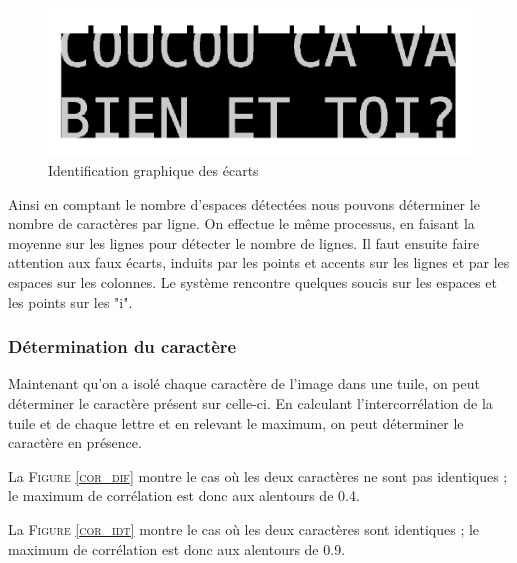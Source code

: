 \documentclass[a4paper,12pt,titlepage]{report}
\begin{document}
	\begin{figure}[h]
		\begin{center}
			\includegraphics[scale=0.4]{../illus/detectionSpace.png}
		\end{center}
		\vspace{-1em}
		\caption{Identification graphique des écarts}
	\end{figure}

	Ainsi en comptant le nombre d'espaces détectées nous pouvons déterminer le nombre de caractères par ligne.
	On effectue le même processus, en faisant la moyenne sur les lignes pour détecter le nombre de lignes.
	Il faut ensuite faire attention aux faux écarts, induits par les points et accents sur les lignes et par les espaces sur les colonnes.
	Le système rencontre quelques soucis sur les espaces et les points sur les "i".
	\subsubsection{Détermination du caractère}
	Maintenant qu'on a isolé chaque caractère de l'image dans une tuile, on peut déterminer le caractère présent sur celle-ci. En calculant l'intercorrélation de la tuile et de chaque lettre et en relevant le maximum, on peut déterminer le caractère en présence.

	La \textsc{Figure \ref{cor_dif}} montre le cas où les deux caractères ne sont pas identiques ; le maximum de corrélation est donc aux alentours de 0.4.
	
	La \textsc{Figure \ref{cor_idt}} montre le cas où les deux caractères sont identiques ; le maximum de corrélation est donc aux alentours de 0.9.
	
	\newpage
	
\end{document}

